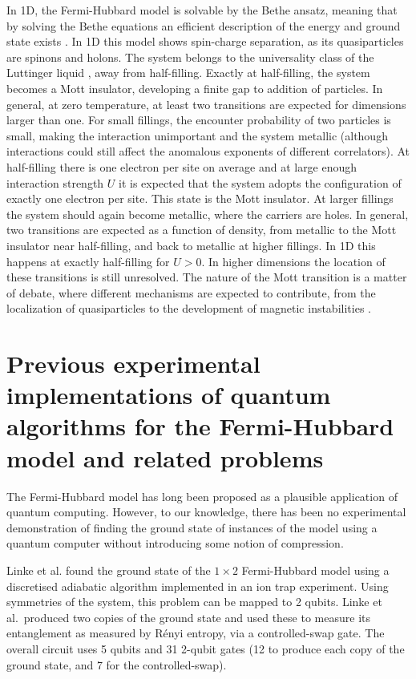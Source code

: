 \documentclass[aps,prb,twoside,superscriptaddress,longbibliography,nofootinbib,floatfix, notitlepage,twocolumn]{revtex4-1}
\begin{document}
In 1D, the Fermi-Hubbard model is solvable by the Bethe ansatz, meaning that by solving the Bethe equations an efficient description of the energy and ground state exists \cite{Lieb1968}. In 1D this model shows spin-charge separation, as its quasiparticles are spinons and holons. The system belongs to the universality class of the Luttinger liquid \cite{Ovchinnikov}, away from half-filling. Exactly at half-filling, the system becomes a Mott insulator, developing  a finite gap to addition of particles.
In general, at zero temperature, at least two transitions are expected for dimensions larger than one. For small fillings, the encounter probability of two particles is small, making the interaction unimportant and the system metallic (although interactions could still affect the anomalous exponents of different correlators). At half-filling there is one electron per site on average and at large enough interaction strength $U$ it is expected that the system adopts the configuration of exactly one electron per site. This state is the Mott insulator. At larger fillings the system should again become metallic, where the carriers are holes. In general, two transitions are expected as a function of density, from metallic to the Mott insulator near half-filling, and back to metallic at higher fillings. In 1D this happens at exactly half-filling for $U>0$. In higher dimensions the location of these transitions is still unresolved. The nature of the Mott transition is a matter of debate, where different mechanisms are expected to contribute, from the localization of quasiparticles\cite{Brinkman1970} to the development of magnetic instabilities \cite{Shastry1990}. 



\section{Previous experimental implementations of quantum algorithms for the Fermi-Hubbard model and related problems}

The Fermi-Hubbard model has long been proposed as a plausible application of quantum computing. However, to our knowledge, there has been no experimental demonstration of finding the ground state of instances of the model using a quantum computer without introducing some notion of compression.

Linke et al.\cite{linke18} found the ground state of the $1\times 2$ Fermi-Hubbard model using a discretised adiabatic algorithm implemented in an ion trap experiment. Using symmetries of the system, this problem can be mapped to 2 qubits. Linke et al.\ produced two copies of the ground state and used these to measure its entanglement as measured by R\'enyi entropy, via a controlled-swap gate. The overall circuit uses 5 qubits and 31 2-qubit gates (12 to produce each copy of the ground state, and 7 for the controlled-swap).
\end{document}
